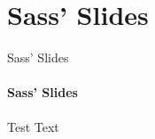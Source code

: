 \section{Sass' Slides}
    \begin{frame}[t]{Sass' Slides}\framesubtitle{Sass' Slides}
        Test Text
    \end{frame}
